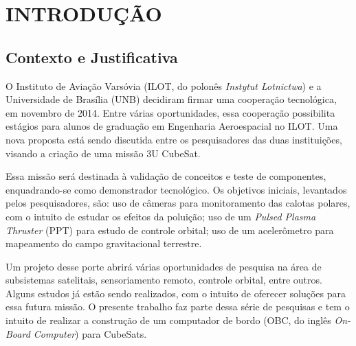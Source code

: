 



\chapter[INTRODUÇÃO]{INTRODUÇÃO}
\section{Contexto e Justificativa}

O Instituto de Aviação Varsóvia (ILOT, do polonês \textit{Instytut Lotnictwa}) e a Universidade de Brasília (UNB) decidiram firmar uma cooperação tecnológica, em novembro de 2014. Entre várias oportunidades, essa cooperação possibilita estágios para alunos de graduação em Engenharia Aeroespacial no ILOT. Uma nova proposta está sendo discutida entre os pesquisadores das duas instituições, visando a criação de uma missão 3U CubeSat.

Essa missão será destinada à validação de conceitos e teste de componentes, enquadrando-se como demonstrador tecnológico. Os objetivos iniciais, levantados pelos pesquisadores, são: uso de câmeras para monitoramento das calotas polares, com o intuito de estudar os efeitos da poluição; uso de um \textit{Pulsed Plasma Thruster} (PPT) para estudo de controle orbital;  uso de um acelerômetro para mapeamento do campo gravitacional terrestre.

Um projeto desse porte abrirá várias oportunidades de pesquisa na área de subsistemas satelitais, sensoriamento remoto, controle orbital, entre outros. Alguns estudos já estão sendo realizados, com o intuito de oferecer soluções para essa futura missão. O presente trabalho faz parte dessa série de pesquisas e tem o intuito de realizar a construção de um computador de bordo (OBC, do inglês \textit{On-Board Computer}) para CubeSats.



